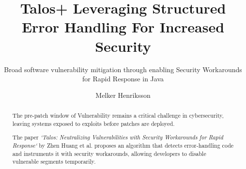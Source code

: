 \documentclass[a4paper,11pt]{report}
\title{Talos+ Leveraging Structured Error Handling For Increased Security}
\subtitle{Broad software vulnerability mitigation through enabling Security Workarounds for Rapid Response in Java}
\author{Melker Henriksson}
\begin{document}
\maketitle

\cleardoublepage
\begin{abstract}


The pre-patch window of Vulnerability remains a critical challenge in cybersecurity, leaving systems exposed to exploits before patches are deployed.

The paper \textit{`Talos: Neutralizing Vulnerabilities with Security Workarounds for Rapid Response`} by Zhen Huang et al. proposes an algorithm that detects error-handling code and instruments it with security workarounds, allowing developers to disable vulnerable segments temporarily. 


\end{abstract}
\end{document}
